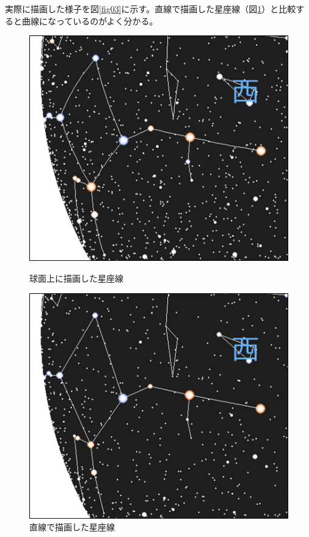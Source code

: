 \documentclass[../main]{subfiles}
\begin{document}
実際に描画した様子を図\ref{fig03}に示す。直線で描画した星座線（図\ref{fig04}）と比較すると曲線になっているのがよく分かる。
\begin{figure}[H]
  \centering
  \begin{minipage}[b]{0.45\linewidth}
    \centering
    \includegraphics[scale=0.6]{sections/Fujisawa/image/correct_constellations.png}
    \caption{球面上に描画した星座線}
    \label{fig03}
  \end{minipage}
  \begin{minipage}[b]{0.45\linewidth}
    \centering
    \includegraphics[scale=0.6]{sections/Fujisawa/image/wrong_constellations.png}
    \caption{直線で描画した星座線}
    \label{fig04}
  \end{minipage}
\end{figure}
\end{document}
